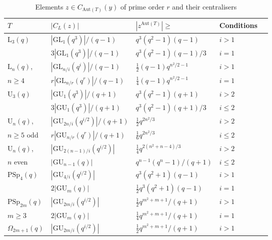 \documentclass[twoside,a4paper,reqno,11pt]{amsart}
\newcommand{\<}{\langle}
\renewcommand{\>}{\rangle}
\newcommand{\leqs}{\leqslant}
\newcommand{\geqs}{\geqslant}
\newcommand{\Aut}{\mathrm{Aut}}
\newcommand{\GL}{\mathrm{GL}}
\newcommand{\PSp}{\mathrm{PSp}}
\newcommand{\LL}{\mathrm{L}}
\newcommand{\UU}{\mathrm{U}}
\newcommand{\GU}{\mathrm{GU}}
\newcommand{\cmrd}{\textcolor{blue}}
\theoremstyle{definition}
\begin{document}
{\small
	\centering
	\begin{table}
		\caption{Elements $z\in C_{\Aut(T)}(y)$ of prime order $r$ and their centralisers}
		\begin{tabular}{@{}lllll@{}}
			\toprule
			$T$ & $|C_L(z)|$  & $|z^{\Aut(T)}|\geqs$ & Conditions\\ \midrule
            $\LL_3(q)$ & $|\GL_1(q^3)|/(q-1)$ & $q^3(q^2-1)(q-1)$ & $i > 1$ \\
            & $3|\GL_1(q^3)|/(q-1)$ & $q^3(q^2-1)(q-1)/3$ & $i = 1$  \\
            \hline
			$\LL_n(q)$, & $|\GL_{n/i}(q^i)|/(q-1)$ & $\frac{1}{2}(q-1)q^{n^2/2-1}$ & $i > 1$  \\
            $n\geqs 4$  & $r|\GL_{n/r}(q^r)|/(q-1)$ & %
            $\frac{1}{4}(q-1)q^{n^2/2-1}$ & $i = 1$ \\
            \hline
            $\UU_3(q)$ & $|\GU_1(q^3)|/(q+1)$ & $q^3(q^2-1)(q+1)$ & $i > 2$\\
            & $3|\GU_1(q^3)|/(q+1)$ & $q^3(q^2-1)(q+1)/3$ & $i \leqs 2$\\
            \hline
            $\UU_n(q)$, &  $|\GU_{2n/i}(q^{i/2})|/(q+1)$ & $\frac{1}{2}q^{2n^2/3}$ & $i > 2$ \\
            $n\geqs 5$ odd &  $r|\GU_{n/r}(q^r)|/(q+1)$ & $\frac{1}{6}q^{2n^2/3}$ & $i \leqs 2$ \\
            \hline
            $\UU_n(q)$,  
            & $|\GU_{2(n-1)/i}(q^{i/2})|$ & $\frac{1}{4}q^{2(n^2+n-4)/3}$ & $i > 2$\\
            $n$ even  & $|\GU_{n-1}(q)|$ & $q^{n-1}(q^n-1)/(q+1)$ & $i \leqs 2$\\
            \hline
            $\PSp_{4}(q)$ & $|\GU_{4/i}(q^{i/2})|$ & $q^3(q^2+1)(q-1)$ & $i > 1$ \\
            & $2|\GU_m(q)|$ & $\frac{1}{2}q^3(q^2+1)(q-1)$ & $i = 1$ \\
                        \hline
            $\PSp_{2m}(q)$ & $|\GU_{2m/i}(q^{i/2})|$ & $\frac{1}{2}q^{m^2+m+1}/(q+1)$ & $i > 1$ \\
            $m \geqs 3$ & $2|\GU_m(q)|$ & $\frac{1}{4}q^{m^2+m+1}/(q+1)$ & $i = 1$ \\
            \hline
            $\Omega_{2m+1}(q)$ & $|\GU_{2m/i}(q^{i/2})|$ & $\frac{1}{2}q^{m^2+m+1}/(q+1)$ & $i > 1$ \\

\end{tabular}
\end{table}}
\end{document}
